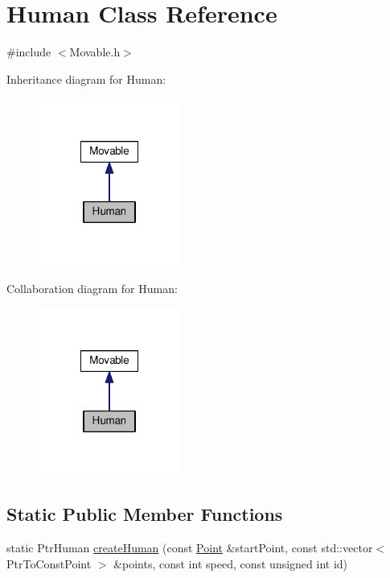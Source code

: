 \hypertarget{classHuman}{\section{Human Class Reference}
\label{classHuman}
}


{\ttfamily \#include $<$Movable.\-h$>$}



Inheritance diagram for Human\-:
\nopagebreak
\begin{figure}[H]
\begin{center}
\leavevmode
\includegraphics[width=132pt]{classHuman__inherit__graph}
\end{center}
\end{figure}


Collaboration diagram for Human\-:
\nopagebreak
\begin{figure}[H]
\begin{center}
\leavevmode
\includegraphics[width=132pt]{classHuman__coll__graph}
\end{center}
\end{figure}
\subsection*{Static Public Member Functions}
\begin{DoxyCompactItemize}
\item 
static Ptr\-Human \hyperlink{classHuman_a09310c96463d7b8f25d49fdee36482ec}{create\-Human} (const \hyperlink{classPoint}{Point} \&start\-Point, const std\-::vector$<$ Ptr\-To\-Const\-Point $>$ \&points, const int speed, const unsigned int id)
\end{DoxyCompactItemize}
